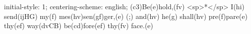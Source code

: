 initial-style: 1;
centering-scheme: english;
(c3)Be(e)hold,(fv) <sp>*</sp> I(hi) send(ijHG) my(f) mes(hv)sen(gf)ger,(e) (;) and(hv) he(g) shall(hv) pre(f)pare(e) thy(ef) way(dvCB) be(cd)fore(ef) thy(fv) face.(e)
